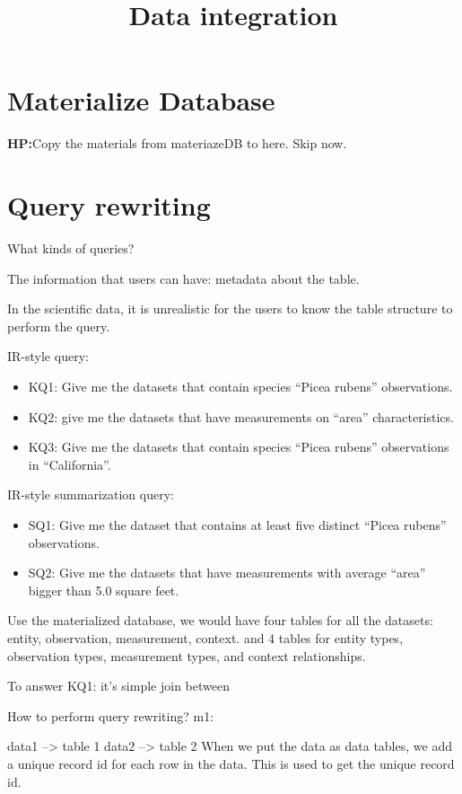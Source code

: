\documentclass[10pt]{article}
\title{Data integration}
\author{}
\begin{document}
\maketitle

\section{Materialize Database}

{\bf HP:}{Copy the materials from materiazeDB to here. Skip now.}

\section{Query rewriting}

What kinds of queries? 

The information that users can have: metadata about the table. 

In the scientific data, it is unrealistic for the users to know the
table structure to perform the query. 

IR-style query: 
\begin{itemize}
\item KQ1: Give me the datasets that contain species ``Picea rubens'' observations.
\item KQ2: give me the datasets that have measurements on ``area''
  characteristics. 
\item KQ3: Give me the datasets that contain species ``Picea rubens''
  observations in ``California''. 
\end{itemize}

IR-style summarization query: 
\begin{itemize}
\item SQ1: Give me the dataset that contains at least five distinct ``Picea rubens'' observations.
\item SQ2: Give me the datasets that have measurements with average ``area''
bigger than 5.0 square feet. 
\end{itemize}

Use the materialized database, we would have four tables for all the datasets: 
entity, observation, measurement, context. 
and 4 tables for entity types, observation types, measurement types,
and context relationships.

To answer KQ1: it's simple join between 

How to perform query rewriting? 
m1:

data1 --> table 1
data2 --> table 2 
When we put the data as data tables, we add a unique record id for
each row in the data. This is used to get the unique record id. 
\end{document}
